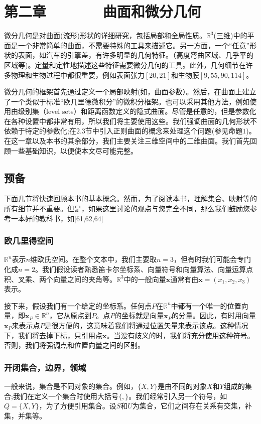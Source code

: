 \section{第二章~~~~~~~曲面和微分几何}

微分几何是对曲面(流形)形状的详细研究，包括局部和全局性质。$\mathbb{R}^3$(三维)中的平面是一个非常简单的曲面，不需要特殊的工具来描述它。另一方面，一个“任意”形状的表面，如汽车的引擎盖，有许多明显的几何特征。（高度弯曲区域、几乎平的区域等)。定量和定性地描述这些特征需要微分几何的工具。此外，几何细节在许多物理和生物过程中都很重要，例如表面张力$[20,21]$和生物膜$[9,55,90,114]$。

微分几何的框架首先通过定义一个局部映射(如，曲面参数）。然后，在曲面上建立了一个类似于标准“欧几里德微积分”的微积分框架。也可以采用其他方法，例如使用由级别集（level sets）和距离函数定义的隐式曲面。尽管是任意的，但是参数化在各种设置中都非常有用，所以我们将主要使用这些。我们强调曲面的几何形状不依赖于特定的参数化;在$2.3$节中引入正则曲面的概念来处理这个问题(参见命题$1$)。
在这一章以及本书的其余部分，我们主要关注三维空间中的二维曲面。我们首先回顾一些基础知识，以便使本文尽可能完整。

\subsection{预备}
下面几节将快速回顾本书的基本概念。然而，为了阅读本书，理解集合、映射等的所有细节并不重要。但是，如果这里讨论的观点与您完全不同，那么我们鼓励您参考一本好的教科书，如[61,62,64]
\subsubsection{欧几里得空间}
$\mathbb{R}^n$表示$n$维欧氏空间。在整个文本中，我们主要取$n=3$，但有时我们可能会专门化成$n=2$。我们假设读者熟悉笛卡尔坐标系、向量符号和向量算法、向量运算点积、叉乘、两个向量之间的夹角等。$\mathbb{R}^3$中的一般向量$\mathbf{x}$通常有由$\mathbf{x}= (x_1, x_2, x_3)$表示。

接下来，假设我们有一个给定的坐标系。任何点$P$在$\mathbb{R}^n$中都有一个唯一的位置向量，即$\mathbf{x}_P\in \mathbb{R}^n$，它从原点到$P$。点$P$的坐标就是向量$\mathbf{x}_P$的分量。因此，有时用向量$\mathbf{x}_P$来表示点$P$是很方便的，这意味着我们将通过位置矢量来表示该点。这种情况下，我们将去掉下标，只引用点$\mathbf{x}$。当没有歧义的时，我们将充分使用这种符号。否则，我们将强调点和位置向量之间的区别。
\subsubsection{开闭集合，边界，领域}
一般来说，集合是不同对象的集合。例如，$\lbrace  X,Y \rbrace$是由不同的对象$X$和$Y$组成的集合;我们在定义一个集合时使用大括号$\lbrace  , \rbrace$。我们经常引入另一个符号，如$Q=\lbrace X , Y \rbrace$，为了方便引用集合。设$S$和$U$为集合，它们之间存在关系有交集，补集，并集等。

